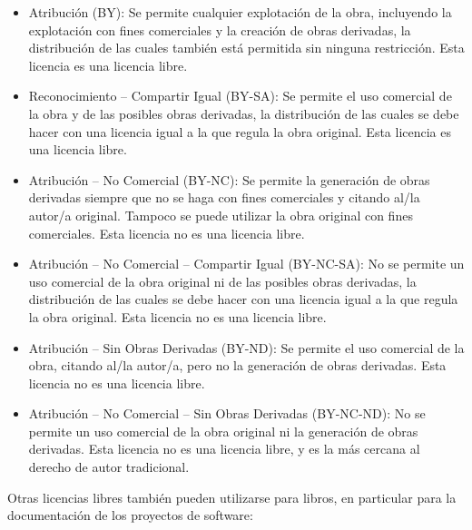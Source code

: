 \begin{itemize}
\item Atribución (BY): Se permite cualquier explotación de la obra, incluyendo la explotación con fines comerciales y la creación de obras derivadas, la distribución de las cuales también está permitida sin ninguna restricción. Esta licencia es una licencia libre.

\item Reconocimiento – Compartir Igual (BY-SA): Se permite el uso comercial de la obra y de las posibles obras derivadas, la distribución de las cuales se debe hacer con una licencia igual a la que regula la obra original. Esta licencia es una licencia libre.

\item Atribución – No Comercial (BY-NC): Se permite la generación de obras derivadas siempre que no se haga con fines comerciales y citando al/la autor/a original. Tampoco se puede utilizar la obra original con fines comerciales. Esta licencia no es una licencia libre.

\item Atribución – No Comercial – Compartir Igual (BY-NC-SA): No se permite un uso comercial de la obra original ni de las posibles obras derivadas, la distribución de las cuales se debe hacer con una licencia igual a la que regula la obra original. Esta licencia no es una licencia libre.

\item Atribución – Sin Obras Derivadas (BY-ND): Se permite el uso comercial de la obra, citando al/la autor/a, pero no la generación de obras derivadas. Esta licencia no es una licencia libre.

\item Atribución – No Comercial – Sin Obras Derivadas (BY-NC-ND): No se permite un uso comercial de la obra original ni la generación de obras derivadas. Esta licencia no es una licencia libre, y es la más cercana al derecho de autor tradicional.

\end{itemize}


Otras licencias libres también pueden utilizarse para libros, en particular para la documentación de los proyectos de software:

